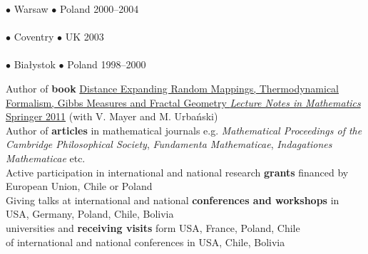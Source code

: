 \documentclass[a4paper, twoside]{scrreprt}
\begin{document}
\noindent{} $\bullet$  Warsaw $\bullet$ Poland \hfill 2000--2004\\ 
\\
\noindent{} $\bullet$ Coventry $\bullet$ UK \hfill 2003\\
\\
\noindent{} $\bullet$  Bia{\l}ystok $\bullet$ Poland \hfill 1998--2000\\ 

\noindent\makebox[\linewidth]{\rule{\textwidth}{0.4pt}}

\vspace{0.1cm}


\noindent\llap{\FA \faBook\ \ }Author of {\bf book} \href{http://www.amazon.com/Distance-Expanding-Thermodynamical-Formalism-Mathematics/dp/3642236499/ref=sr_1_1?s=books&ie=UTF8&qid=1410309067&sr=1-1}{Distance Expanding Random Mappings, Thermodynamical Formalism, Gibbs Measures and Fractal Geometry {\it Lecture Notes in Mathematics} Springer 2011} (with V. Mayer and M. Urbański)\\
\noindent\llap{\FA \faPencil\ \ }Author of {\bf articles} in 
mathematical journals e.g. 
{\it Mathematical Proceedings of the Cambridge Philosophical Society}, {\it Fundamenta Mathematicae}, {\it Indagationes Mathematicae} etc.\\
\noindent\llap{\FA \faBeaker\ \ }Active participation in international and national research {\bf grants} financed by European Union, Chile or Poland\\
\noindent\llap{\FA \faBullhorn\ \ }Giving talks at international and national {\bf conferences and workshops} in USA, Germany, Poland, 
Chile, Bolivia\\
\noindent{} 
universities and {\bf receiving visits} form USA, France, Poland, Chile\\
\noindent{} of international and national conferences in USA, Chile, Bolivia
\end{document}
